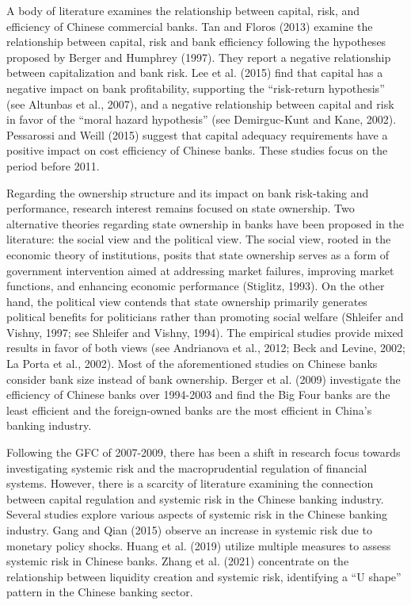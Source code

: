 \documentclass[
  12pt,
  a4paper,
]{scrreprt}
\begin{document}
A body of literature examines the relationship between capital, risk,
and efficiency of Chinese commercial banks. Tan and Floros (2013)
examine the relationship between capital, risk and bank efficiency
following the hypotheses proposed by Berger and Humphrey (1997). They
report a negative relationship between capitalization and bank risk. Lee
et al. (2015) find that capital has a negative impact on bank
profitability, supporting the ``risk-return hypothesis'' (see Altunbas
et al., 2007), and a negative relationship between capital and risk in
favor of the ``moral hazard hypothesis'' (see Demirguc-Kunt and Kane,
2002). Pessarossi and Weill (2015) suggest that capital adequacy
requirements have a positive impact on cost efficiency of Chinese banks.
These studies focus on the period before 2011.

Regarding the ownership structure and its impact on bank risk-taking and
performance, research interest remains focused on state ownership. Two
alternative theories regarding state ownership in banks have been
proposed in the literature: the social view and the political view. The
social view, rooted in the economic theory of institutions, posits that
state ownership serves as a form of government intervention aimed at
addressing market failures, improving market functions, and enhancing
economic performance (Stiglitz, 1993). On the other hand, the political
view contends that state ownership primarily generates political
benefits for politicians rather than promoting social welfare (Shleifer
and Vishny, 1997; see Shleifer and Vishny, 1994). The empirical studies
provide mixed results in favor of both views (see Andrianova et al.,
2012; Beck and Levine, 2002; La Porta et al., 2002). Most of the
aforementioned studies on Chinese banks consider bank size instead of
bank ownership. Berger et al. (2009) investigate the efficiency of
Chinese banks over 1994-2003 and find the Big Four banks are the least
efficient and the foreign-owned banks are the most efficient in China's
banking industry.

Following the GFC of 2007-2009, there has been a shift in research focus
towards investigating systemic risk and the macroprudential regulation
of financial systems. However, there is a scarcity of literature
examining the connection between capital regulation and systemic risk in
the Chinese banking industry. Several studies explore various aspects of
systemic risk in the Chinese banking industry. Gang and Qian (2015)
observe an increase in systemic risk due to monetary policy shocks.
Huang et al. (2019) utilize multiple measures to assess systemic risk in
Chinese banks. Zhang et al. (2021) concentrate on the relationship
between liquidity creation and systemic risk, identifying a ``U shape''
pattern in the Chinese banking sector.
\end{document}
